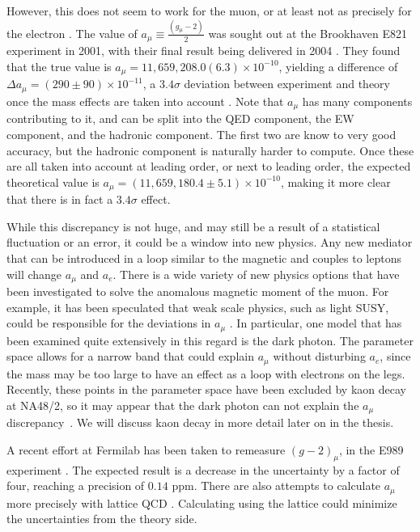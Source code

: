 However, this does not seem to work for the muon, or at least not as precisely for the electron \cite{Jegerlehner:2009ry}.
The value of $a_\mu \equiv \frac{(g_\mu-2)}{2}$ was sought out at the Brookhaven E821 experiment in 2001, with their final result being delivered in 2004 \cite{Hagiwara:2006jt}.
They found that the true value is $a_\mu = 11,659,208.0(6.3)\times 10^{-10}$, yielding a difference of $\Delta a_\mu = (290\pm90)\times 10^{-11}$, a $3.4\sigma$ deviation between experiment and theory once the mass effects are taken into account \cite{Jegerlehner:2009ry}.
Note that $a_\mu$ has many components contributing to it, and can be split into the QED component, the EW component, and the hadronic component.
The first two are know to very good accuracy, but the hadronic component is naturally harder to compute.
Once these are all taken into account at leading order, or next to leading order, the expected theoretical value is $a_\mu = (11,659,180.4 \pm 5.1)\times 10^{-10}$, making it more clear that there is in fact a $3.4\sigma$ effect.

While this discrepancy is not huge, and may still be a result of a statistical fluctuation or an error, it could be a window into new physics.
Any new mediator that can be introduced in a loop similar to the magnetic and couples to leptons will change $a_\mu$ and $a_e$.
There is a wide variety of new physics options that have been investigated to solve the anomalous magnetic moment of the muon.
For example, it has been speculated that weak scale physics, such as light SUSY, could be responsible for the deviations in $a_\mu$ \cite{Czarnecki:2001pv}.
In particular, one model that has been examined quite extensively in this regard is the dark photon.
The parameter space allows for a narrow band that could explain $a_\mu$ without disturbing $a_e$, since the mass may be too large to have an effect as a loop with electrons on the legs.
Recently, these points in the parameter space have been excluded by kaon decay at NA48/2, so it may appear that the dark photon can not explain the $a_\mu$ discrepancy~\cite{Batley:2015lha}.
We will discuss kaon decay in more detail later on in the thesis.

A recent effort at Fermilab has been taken to remeasure $(g-2)_\mu$, in the E989 experiment \cite{Venanzoni:2014ixa}.
The expected result is a decrease in the uncertainty by a factor of four, reaching a precision of $0.14$ ppm.
There are also attempts to calculate $a_\mu$ more precisely with lattice QCD \cite{Juttner:2009yb, Renner:2010zj, Malak:2015sla}.
Calculating using the lattice could minimize the uncertainties from the theory side.
